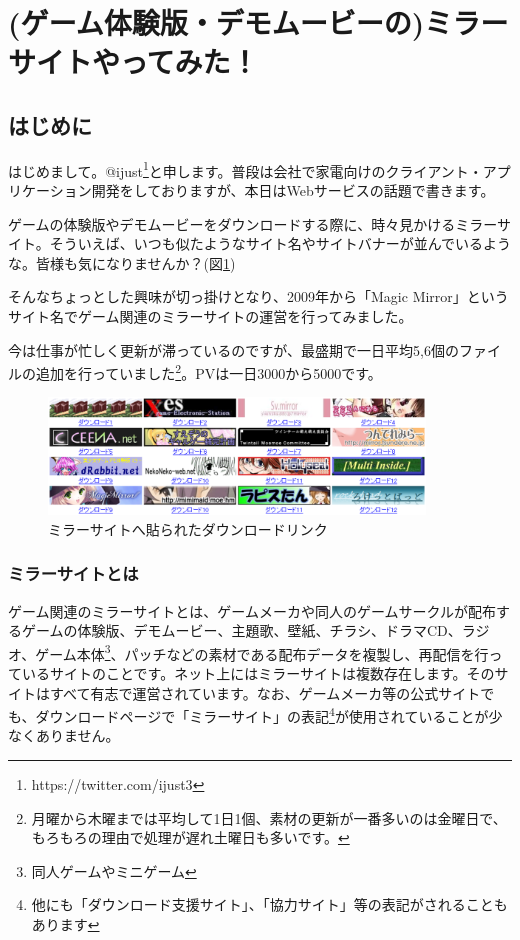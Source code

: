 \section{(ゲーム体験版・デモムービーの)ミラーサイトやってみた！}

\subsection{はじめに}
はじめまして。@ijust\footnote{https://twitter.com/ijust3}と申します。普段は会社で家電向けのクライアント・アプリケーション開発をしておりますが、本日はWebサービスの話題で書きます。

ゲームの体験版やデモムービーをダウンロードする際に、時々見かけるミラーサイト。そういえば、いつも似たようなサイト名やサイトバナーが並んでいるような。皆様も気になりませんか？(図\ref{fig:mirrors})

そんなちょっとした興味が切っ掛けとなり、2009年から「Magic Mirror」というサイト名でゲーム関連のミラーサイトの運営を行ってみました。\cite{MagicMirror}

今は仕事が忙しく更新が滞っているのですが、最盛期で一日平均5,6個のファイルの追加を行っていました\footnote{月曜から木曜までは平均して1日1個、素材の更新が一番多いのは金曜日で、もろもろの理由で処理が遅れ土曜日も多いです。}。PVは一日3000から5000です。

\begin{figure}[hbp]
 \begin{center}
  \includegraphics[width=100mm]{ijust3-mirror/img/mirrors.eps}
 \end{center}
 \caption{ミラーサイトへ貼られたダウンロードリンク}
 \label{fig:mirrors}
\end{figure}

\subsubsection{ミラーサイトとは}

ゲーム関連のミラーサイトとは、ゲームメーカや同人のゲームサークルが配布するゲームの体験版、デモムービー、主題歌、壁紙、チラシ、ドラマCD、ラジオ、ゲーム本体\footnote{同人ゲームやミニゲーム}、パッチなどの素材である配布データを複製し、再配信を行っているサイトのことです。ネット上にはミラーサイトは複数存在します。そのサイトはすべて有志で運営されています。なお、ゲームメーカ等の公式サイトでも、ダウンロードページで「ミラーサイト」の表記\footnote{他にも「ダウンロード支援サイト」、「協力サイト」等の表記がされることもあります}が使用されていることが少なくありません。

